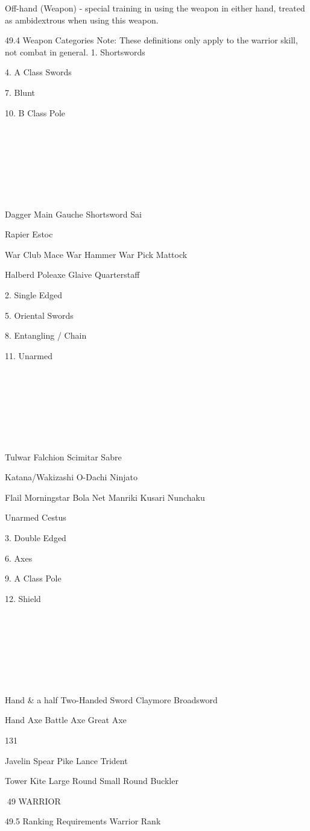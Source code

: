 \documentclass[a4paper]{article}
\begin{document}
\begin{multicols}{3}
Off-hand (Weapon) - special training in using the
weapon in either hand, treated as ambidextrous
when using this weapon.

49.4 Weapon Categories
Note: These definitions only apply to the warrior skill, not combat in general.
1. Shortswords

4. A Class Swords

7. Blunt

10. B Class Pole




















Dagger
Main Gauche
Shortsword
Sai

Rapier
Estoc

War Club
Mace
War Hammer
War Pick
Mattock

Halberd
Poleaxe
Glaive
Quarterstaff

2. Single Edged

5. Oriental Swords

8. Entangling / Chain

11. Unarmed




















Tulwar
Falchion
Scimitar
Sabre

Katana/Wakizashi
O-Dachi
Ninjato

Flail
Morningstar
Bola
Net
Manriki Kusari
Nunchaku

Unarmed
Cestus

3. Double Edged

6. Axes

9. A Class Pole

12. Shield






















Hand & a half
Two-Handed Sword
Claymore
Broadsword

Hand Axe
Battle Axe
Great Axe

131

Javelin
Spear
Pike
Lance
Trident

Tower
Kite
Large Round
Small Round
Buckler

49 WARRIOR

49.5 Ranking Requirements
Warrior Rank


\end{multicols}
\end{document}

